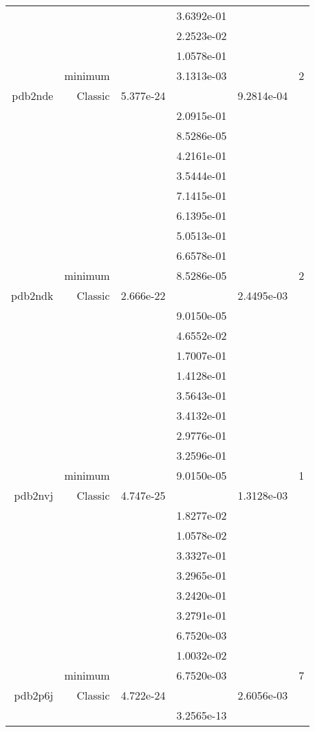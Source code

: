 \begin{xltabular}{\textwidth}{r|rS[table-format=1.3e+2]S[table-format=1.4e+2]S[table-format=1.4e+2]S[table-format=-1.5]}
&  &  & 3.6392e-01 & & \\
&  &  & 2.2523e-02 & & \\
&  &  & 1.0578e-01 & & \\
& minimum &  & 3.1313e-03 & & 2 \\  \addlinespace
pdb2nde & Classic & 5.377e-24 &  & 9.2814e-04 & \\
&  &  & 2.0915e-01 & & \\
&  &  & 8.5286e-05 & & \\
&  &  & 4.2161e-01 & & \\
&  &  & 3.5444e-01 & & \\
&  &  & 7.1415e-01 & & \\
&  &  & 6.1395e-01 & & \\
&  &  & 5.0513e-01 & & \\
&  &  & 6.6578e-01 & & \\
& minimum &  & 8.5286e-05 & & 2 \\  \addlinespace
pdb2ndk & Classic & 2.666e-22 &  & 2.4495e-03 & \\
&  &  & 9.0150e-05 & & \\
&  &  & 4.6552e-02 & & \\
&  &  & 1.7007e-01 & & \\
&  &  & 1.4128e-01 & & \\
&  &  & 3.5643e-01 & & \\
&  &  & 3.4132e-01 & & \\
&  &  & 2.9776e-01 & & \\
&  &  & 3.2596e-01 & & \\
& minimum &  & 9.0150e-05 & & 1 \\  \addlinespace
pdb2nvj & Classic & 4.747e-25 &  & 1.3128e-03 & \\
&  &  & 1.8277e-02 & & \\
&  &  & 1.0578e-02 & & \\
&  &  & 3.3327e-01 & & \\
&  &  & 3.2965e-01 & & \\
&  &  & 3.2420e-01 & & \\
&  &  & 3.2791e-01 & & \\
&  &  & 6.7520e-03 & & \\
&  &  & 1.0032e-02 & & \\
& minimum &  & 6.7520e-03 & & 7 \\  \addlinespace
pdb2p6j & Classic & 4.722e-24 &  & 2.6056e-03 & \\
&  &  & 3.2565e-13 & & \\

\end{xltabular}
